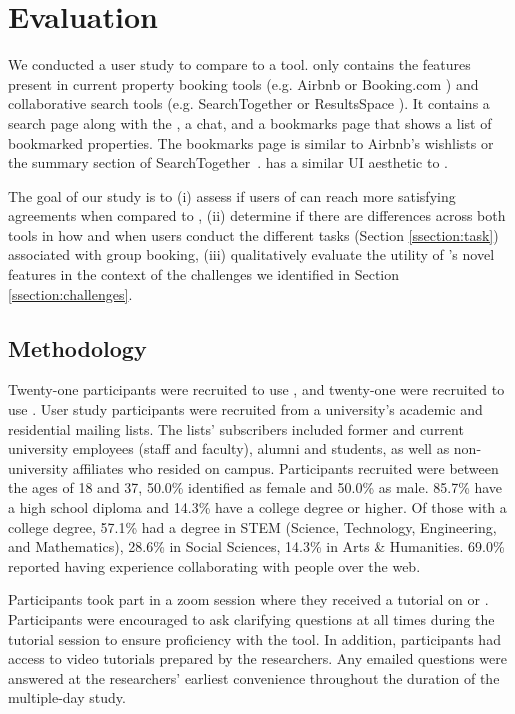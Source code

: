 \section{Evaluation} \label{section:evaluation}
We conducted a user study to compare \tool to a \baseline tool. \baseline only contains the features present in current property booking tools (e.g. Airbnb \cite{airbnb} or Booking.com \cite{booking}) and collaborative search tools (e.g. SearchTogether \cite{searchtogether} or ResultsSpace \cite{resultsspace}). It contains a search page along with the \collabQueryPanel, a chat, and a bookmarks page that shows a list of bookmarked properties. The bookmarks page is similar to Airbnb's wishlists or the summary section of SearchTogether~\cite{searchtogether}.  \baseline has a similar UI aesthetic to \tool.  

The goal of our study is to  (i) assess if users of \tool can reach more satisfying agreements when compared to \baseline, (ii) determine if there are differences across both tools in how and when users conduct the different tasks (Section \ref{ssection:task}) associated with group booking, (iii) qualitatively evaluate the utility of \tool's novel features in the context of the challenges we identified in Section \ref{ssection:challenges}. 

\subsection{Methodology} \label{ssection:methodology}
Twenty-one participants were recruited to use \tool, and twenty-one were recruited to use \baseline. User study participants were recruited from a university's academic and residential mailing lists. The lists' subscribers included former and current university employees (staff and faculty), alumni and students, as well as non-university affiliates who resided on campus. Participants recruited  were between the ages of 18 and 37, 50.0\% identified as female and 50.0\% as male.  85.7\% have a high school diploma and 14.3\% have a college degree or higher. Of those with a college degree, 57.1\% had a degree in STEM (Science, Technology, Engineering, and Mathematics), 28.6\% in Social Sciences, 14.3\% in Arts \& Humanities. 69.0\% reported having experience collaborating with people over the web. 

Participants took part in a zoom session where they received a tutorial on \tool or \baseline. Participants were encouraged to ask clarifying questions at all times during the tutorial session to ensure proficiency with the tool. In addition, participants had access to video tutorials prepared by the researchers. Any emailed questions were answered at the researchers' earliest convenience throughout the duration of the multiple-day study. 

